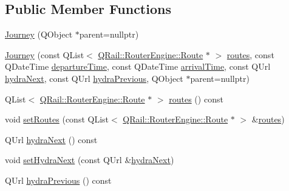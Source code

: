 \subsection*{Public Member Functions}
\begin{DoxyCompactItemize}
\item 
\mbox{\hyperlink{classQRail_1_1RouterEngine_1_1Journey_af49050161e106f4c47cbddc8d82ebaa0}{Journey}} (Q\+Object $\ast$parent=nullptr)
\item 
\mbox{\hyperlink{classQRail_1_1RouterEngine_1_1Journey_ac9eff966320fdad0ebdd48e06e42faab}{Journey}} (const Q\+List$<$ \mbox{\hyperlink{classQRail_1_1RouterEngine_1_1Route}{Q\+Rail\+::\+Router\+Engine\+::\+Route}} $\ast$ $>$ \mbox{\hyperlink{classQRail_1_1RouterEngine_1_1Journey_ac1ead02119493cf91dc47f867034108e}{routes}}, const Q\+Date\+Time \mbox{\hyperlink{classQRail_1_1RouterEngine_1_1Journey_a58b92b24d9d29ebb3cb47994b92eaa13}{departure\+Time}}, const Q\+Date\+Time \mbox{\hyperlink{classQRail_1_1RouterEngine_1_1Journey_a8a4e6733fceea2902fc3b0f5cb6b077c}{arrival\+Time}}, const Q\+Url \mbox{\hyperlink{classQRail_1_1RouterEngine_1_1Journey_af2e3a86d876b397e5a88b89aea673145}{hydra\+Next}}, const Q\+Url \mbox{\hyperlink{classQRail_1_1RouterEngine_1_1Journey_a670dbe08bcc3ce8e8003a0429661e18f}{hydra\+Previous}}, Q\+Object $\ast$parent=nullptr)
\item 
Q\+List$<$ \mbox{\hyperlink{classQRail_1_1RouterEngine_1_1Route}{Q\+Rail\+::\+Router\+Engine\+::\+Route}} $\ast$ $>$ \mbox{\hyperlink{classQRail_1_1RouterEngine_1_1Journey_ac1ead02119493cf91dc47f867034108e}{routes}} () const
\item 
void \mbox{\hyperlink{classQRail_1_1RouterEngine_1_1Journey_a99468617b683a7f07de157b30d1b9048}{set\+Routes}} (const Q\+List$<$ \mbox{\hyperlink{classQRail_1_1RouterEngine_1_1Route}{Q\+Rail\+::\+Router\+Engine\+::\+Route}} $\ast$ $>$ \&\mbox{\hyperlink{classQRail_1_1RouterEngine_1_1Journey_ac1ead02119493cf91dc47f867034108e}{routes}})
\item 
Q\+Url \mbox{\hyperlink{classQRail_1_1RouterEngine_1_1Journey_af2e3a86d876b397e5a88b89aea673145}{hydra\+Next}} () const
\item 
void \mbox{\hyperlink{classQRail_1_1RouterEngine_1_1Journey_a79b4e4ae7edc0508cf05d1c250713283}{set\+Hydra\+Next}} (const Q\+Url \&\mbox{\hyperlink{classQRail_1_1RouterEngine_1_1Journey_af2e3a86d876b397e5a88b89aea673145}{hydra\+Next}})
\item 
Q\+Url \mbox{\hyperlink{classQRail_1_1RouterEngine_1_1Journey_a670dbe08bcc3ce8e8003a0429661e18f}{hydra\+Previous}} () const

\end{DoxyCompactItemize}
